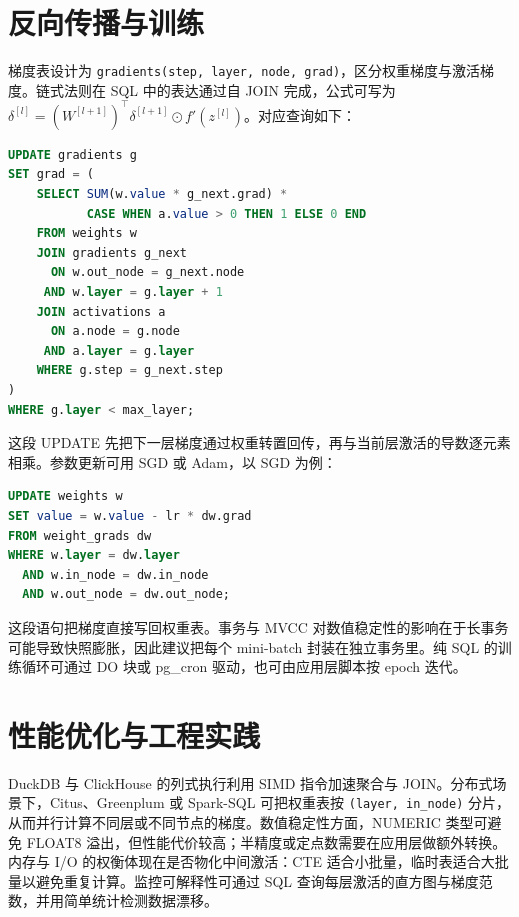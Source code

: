 \chapter{反向传播与训练}
梯度表设计为 \texttt{gradients(step, layer, node, grad)}，区分权重梯度与激活梯度。链式法则在 SQL 中的表达通过自 JOIN 完成，公式可写为 $\delta^{[l]} = (W^{[l+1]})^\top \delta^{[l+1]} \odot f'(z^{[l]})$。对应查询如下：\par
\begin{lstlisting}[language=sql]
UPDATE gradients g
SET grad = (
    SELECT SUM(w.value * g_next.grad) * 
           CASE WHEN a.value > 0 THEN 1 ELSE 0 END
    FROM weights w
    JOIN gradients g_next 
      ON w.out_node = g_next.node 
     AND w.layer = g.layer + 1
    JOIN activations a 
      ON a.node = g.node 
     AND a.layer = g.layer
    WHERE g.step = g_next.step
)
WHERE g.layer < max_layer;
\end{lstlisting}
这段 UPDATE 先把下一层梯度通过权重转置回传，再与当前层激活的导数逐元素相乘。参数更新可用 SGD 或 Adam，以 SGD 为例：\par
\begin{lstlisting}[language=sql]
UPDATE weights w
SET value = w.value - lr * dw.grad
FROM weight_grads dw
WHERE w.layer = dw.layer 
  AND w.in_node = dw.in_node 
  AND w.out_node = dw.out_node;
\end{lstlisting}
这段语句把梯度直接写回权重表。事务与 MVCC 对数值稳定性的影响在于长事务可能导致快照膨胀，因此建议把每个 mini-batch 封装在独立事务里。纯 SQL 的训练循环可通过 DO 块或 pg\_{}cron 驱动，也可由应用层脚本按 epoch 迭代。\par
\chapter{性能优化与工程实践}
DuckDB 与 ClickHouse 的列式执行利用 SIMD 指令加速聚合与 JOIN。分布式场景下，Citus、Greenplum 或 Spark-SQL 可把权重表按 \texttt{(layer, in\_{}node)} 分片，从而并行计算不同层或不同节点的梯度。数值稳定性方面，NUMERIC 类型可避免 FLOAT8 溢出，但性能代价较高；半精度或定点数需要在应用层做额外转换。内存与 I/O 的权衡体现在是否物化中间激活：CTE 适合小批量，临时表适合大批量以避免重复计算。监控可解释性可通过 SQL 查询每层激活的直方图与梯度范数，并用简单统计检测数据漂移。\par
